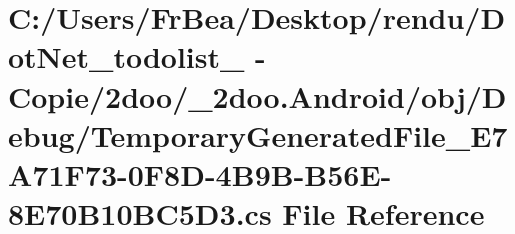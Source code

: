 \hypertarget{_android_2obj_2_debug_2_temporary_generated_file___e7_a71_f73-0_f8_d-4_b9_b-_b56_e-8_e70_b10_b_c5_d3_8cs}{
\section{C:/Users/FrBea/Desktop/rendu/DotNet\_\-todolist\_ - Copie/2doo/\_\-2doo.Android/obj/Debug/TemporaryGeneratedFile\_\-E7A71F73-0F8D-4B9B-B56E-8E70B10BC5D3.cs File Reference}
\label{_android_2obj_2_debug_2_temporary_generated_file___e7_a71_f73-0_f8_d-4_b9_b-_b56_e-8_e70_b10_b_c5_d3_8cs}
}
